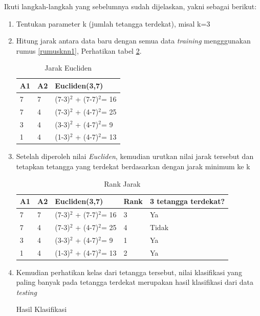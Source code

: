Ikuti langkah-langkah yang sebelumnya sudah dijelaskan, yakni sebagai berikut:
\begin{enumerate}
    \item Tentukan parameter k (jumlah tetangga terdekat), misal k=3
    \item Hitung jarak antara data baru dengan semua data \textit{training} mengggunakan rumus \ref{rumusknn1}, Perhatikan tabel \ref{knn3}.
    \begin{table}[!ht]
    \centering
    \caption{Jarak Eucliden}
    \label{knn3}
\begin{tabular}{|l|l|l|}
\hline
A1 & A2 & Eucliden(3,7)               \\ \hline
7  & 7  & (7-3)$^{2}$ + (7-7)$^{2}$= 16 \\ \hline
7  & 4  & (7-3)$^{2}$ + (4-7)$^{2}$= 25 \\ \hline
3  & 4  & (3-3)$^{2}$ + (4-7)$^{2}$= 9 \\ \hline
1  & 4  & (1-3)$^{2}$ + (4-7)$^{2}$= 13 \\ \hline
\end{tabular}
\end{table}
\item Setelah diperoleh nilai \textit{Eucliden}, kemudian urutkan nilai jarak tersebut dan tetapkan tetangga yang terdekat berdasarkan dengan jarak minimum ke k
\begin{table}[!ht]
    \centering
    \caption{Rank Jarak}
    \label{knn3}
\begin{tabular}{|l|l|l|l|l|}
\hline
A1 & A2 & Eucliden(3,7)               & Rank & 3 tetangga terdekat? \\ \hline
7  & 7  & (7-3)$^{2}$ + (7-7)$^{2}$= 16 & 3    & Ya                   \\ \hline
7  & 4  & (7-3)$^{2}$ + (4-7)$^{2}$= 25 & 4    & Tidak                \\ \hline
3  & 4  & (3-3)$^{2}$ + (4-7)$^{2}$= 9  & 1    & Ya                   \\ \hline
1  & 4  & (1-3)$^{2}$ + (4-7)$^{2}$= 13 & 2    & Ya                   \\ \hline
\end{tabular}
\end{table}
\pagebreak
\item Kemudian perhatikan kelas dari tetangga tersebut, nilai klasifikasi yang paling banyak pada tetangga terdekat merupakan hasil klasifikasi dari data \textit{testing}
\begin{table}[!ht]
    \centering
    \caption{Hasil Klasifikasi}

\end{table}
\end{enumerate}
